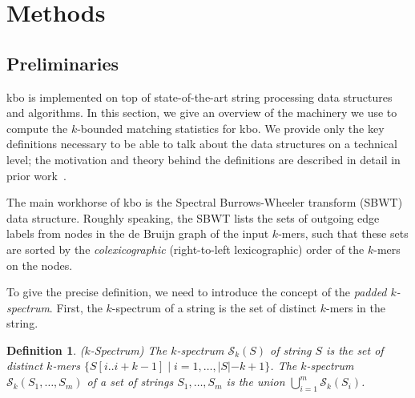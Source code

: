 \documentclass[unnumsec,webpdf,contemporary,large]{oup-authoring-template}%
\theoremstyle{thmstyleone}%
\theoremstyle{thmstyletwo}%
\theoremstyle{thmstylethree}%
\newtheorem{definition}{Definition}
\begin{document}

\section{Methods}\label{methods}

\subsection{Preliminaries}\label{preliminaries}

{\sf kbo} is implemented on top of state-of-the-art string processing data structures and algorithms. In this section, we give an overview of the machinery we use to compute the $k$-bounded matching statistics for {\sf kbo}. We provide only the key definitions necessary to be able to talk about the data structures on a technical level; the motivation and theory behind the definitions are described in detail in prior work~\cite{alanko2023longest, alanko2024finimizers, alanko2023small}.




The main workhorse of {\sf kbo} is the Spectral Burrows-Wheeler transform (SBWT) data structure. Roughly speaking, the SBWT lists the sets of outgoing edge labels from nodes in the de Bruijn graph of the input $k$-mers, such that these sets are sorted by the \emph{colexicographic} (right-to-left lexicographic) order of the $k$-mers on the nodes.

To give the precise definition, we need to introduce the concept of the \emph{padded $k$-spectrum}. First, the $k$-spectrum of a string is the set of distinct $k$-mers in the string.

\begin{definition}($k$-Spectrum) The $k$-spectrum $\mathcal{S}_k(S)$ of string $S$ is the set of distinct $k$-mers $\{S[i..i+k-1] \; | \; i = 1 , \ldots, |S|-k+1\}$.
%
The $k$-spectrum $\mathcal{S}_k(S_1, \ldots, S_m)$ of a set of strings $S_1, \ldots, S_m$ is the union $\bigcup_{i = 1}^m \mathcal{S}_k(S_i)$.
\end{definition}
\end{document}
